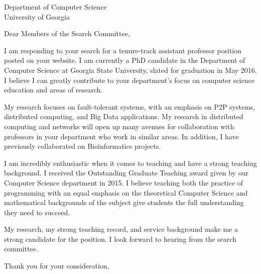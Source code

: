 \documentclass[12pt]{letter}
\date{}
\begin{document}
 
	\begin{letter}{Department of Computer Science\\ University of Georgia} 
		\opening{Dear Members of the Search Committee,} 
		
		I am responding to your search for a tenure-track assistant professor position posted on your website.
		I am currently a PhD candidate in the Department of Computer Science at Georgia State University, slated for graduation in May 2016.
		I believe I can greatly contribute to your department's focus on computer science education and areas of research.
		
		My research focuses on fault-tolerant systems, with an emphasis on P2P systems, distributed computing, and Big Data applications.
		My research in distributed computing and networks will open up many avenues for collaboration with professors in your department who work in similar areas.
		In addition, I have previously collaborated on Bioinformatics projects.
		
		
		
		I am incredibly enthusiastic when it comes to teaching and have a strong teaching background.
		I received the Outstanding Graduate Teaching award given by our Computer Science department in 2015.
		I believe teaching both the practice of programming with an equal emphasis on the theoretical Computer Science and mathematical backgrounds of the subject give students the full understanding they need to succeed.
		
		
		
		
		My research, my strong teaching record, and service background make me a strong candidate for the position.
		I look forward to hearing from the search committee.
		
		
		\closing{Thank you for your consideration,} 
	\end{letter} 
\end{document}
